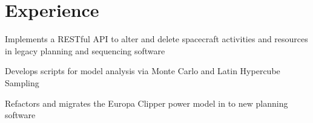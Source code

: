 \documentclass[letterpaper]{deedy-resume} %
\begin{document}
\begin{minipage}[t]{0.33\textwidth}


\end{minipage} %
\hfill
%
%
\begin{minipage}[t]{0.66\textwidth} %


\section{Experience}





\vspace{\topsep}
\begin{tightitemize}
    \item Implements a RESTful API to alter and delete spacecraft activities and resources in legacy planning and sequencing software
    \item Develops scripts for model analysis via Monte Carlo and Latin Hypercube Sampling
    \item Refactors and migrates the Europa Clipper power model in to new planning software
\end{tightitemize}


\end{minipage}
\end{document}
